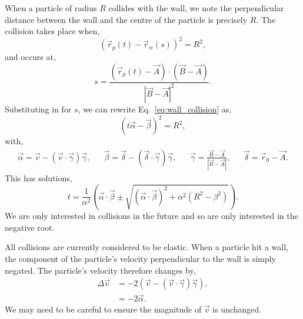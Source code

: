 \documentclass{article}
\begin{document}
When a particle of radius $R$ collides with the wall, we note the perpendicular distance between the wall and the centre of the particle is precisely $R$. The collision takes place when,
\begin{equation}
\label{eq:wall_collision}
    (\vec{r}_p(t) - \vec{r}_w(s))^2 = R^2,
\end{equation}
and occurs at,
\begin{equation}
    s
    =
    \frac{(\vec{r}_p(t) - \vec{A}) \cdot (\vec{B} - \vec{A})}{|\vec{B} - \vec{A}|^2}.
\end{equation}
Substituting in for $s$, we can rewrite Eq.~\ref{eq:wall_collision} as,
\begin{equation}
    (t\vec{\alpha} - \vec{\beta})^2 = R^2,
\end{equation}
with,
\begin{align}
    \vec{\alpha}
    =
    \vec{v} - (\vec{v} \cdot \vec{\gamma}) \vec{\gamma},
    &&
    \vec{\beta}
    =
    \vec{\delta} - (\vec{\delta} \cdot \vec{\gamma}) \vec{\gamma},
    &&
    \vec{\gamma} = \frac{\vec{B} - \vec{A}}{|\vec{B}-\vec{A}|},
    &&
    \vec{\delta} = \vec{r}_0 - \vec{A}.
\end{align}
This has solutions,
\begin{equation}
\label{eq:wall_collision_sol}
    t
    =
    \frac{1}{\alpha^2}
    \left(
        \vec{\alpha} \cdot \vec{\beta}
        \pm
        \sqrt{(\vec{\alpha} \cdot \vec{\beta})^2 + \alpha^2(R^2 - \beta^2)}
    \right).
\end{equation}
We are only interested in collisions in the future and so are only interested in the negative root.

All collisions are currently considered to be elastic. When a particle hit a wall, the component of the particle's velocity perpendicular to the wall is simply negated. The particle's velocity therefore changes by,
\begin{align}
    \Delta \vec{v}
    &=
    -2(\vec{v} - (\vec{v} \cdot \vec{\gamma}) \vec{\gamma}), \\
    &=
    -2 \vec{\alpha}.
\end{align}
We may need to be careful to ensure the magnitude of $\vec{v}$ is unchanged.
\end{document}
